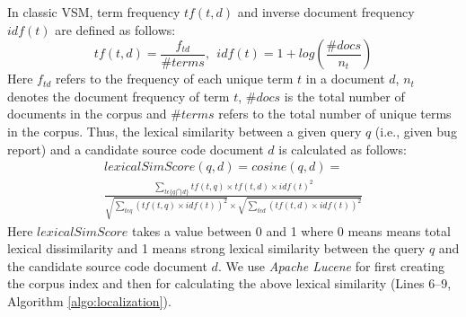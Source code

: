 \documentclass[sigconf,review,anonymous]{acmart}
\begin{document}
In classic VSM, term frequency $tf(t,d)$ and inverse document frequency $idf (t)$ are defined as follows:
\begin{equation*}
tf(t,d)=\frac{f_{td}}{\#terms},~~idf(t)=1+log(\frac{\#docs}{n_{t}})
\end{equation*}
Here $f_{td}$ refers to the frequency of each unique term {$t$} in a document {$d$}, $n_t$ denotes the document frequency of term $t$, $\#docs$ is the total number of documents in the corpus and $\#terms$ refers to the total number of unique terms in the corpus.  
Thus, the lexical similarity between a given query $q$ (i.e., given bug report) and a candidate source code document $d$ is calculated as follows:
\begin{multline*}\label{VSMequation}
lexicalSimScore(q,d)= cosine(q,d) =
\\
\frac{\sum_{t\epsilon \{q\bigcap d\}}tf(t,q)\times tf(t,d)\times idf(t)^{2}
}{\sqrt{\sum_{t\epsilon q}(tf(t,q)\times idf(t))^2}\times
	\sqrt{\sum_{t\epsilon d}(tf(t,d)\times idf(t))^2}}
\end{multline*}
Here $lexicalSimScore$ takes a value between 0 and 1 where 0 means means total lexical dissimilarity and 1 means strong lexical similarity between the query $q$ and the candidate source code document $d$. We use \emph{Apache Lucene} for first creating the corpus index and then for calculating the above lexical similarity (Lines 6--9, Algorithm \ref{algo:localization}).
\end{document}
